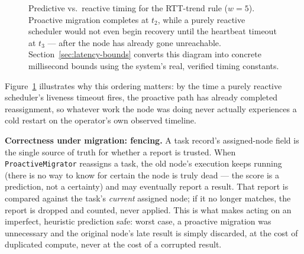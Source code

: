 \documentclass[conference]{IEEEtran}
\begin{document}
\begin{figure}[t]
\centering
{}
\caption{Predictive vs.\ reactive timing for the RTT-trend rule ($w=5$). Proactive migration completes
at $t_2$, while a purely reactive scheduler would not even begin recovery until the heartbeat timeout
at $t_3$ — after the node has already gone unreachable. Section~\ref{sec:latency-bounds} converts this
diagram into concrete millisecond bounds using the system's real, verified timing constants.}
\label{fig:migration-timeline}
\end{figure}

Figure~\ref{fig:migration-timeline} illustrates why this ordering matters: by the time a purely
reactive scheduler's liveness timeout fires, the proactive path has already completed reassignment,
so whatever work the node was doing never actually experiences a cold restart on the operator's own
observed timeline.

\textbf{Correctness under migration: fencing.} A task record's assigned-node field is the single
source of truth for whether a report is trusted. When \texttt{ProactiveMigrator} reassigns a task, the
old node's execution keeps running (there is no way to know for certain the node is truly dead — the
score is a prediction, not a certainty) and may eventually report a result. That report is compared
against the task's \emph{current} assigned node; if it no longer matches, the report is dropped and
counted, never applied. This is what makes acting on an imperfect, heuristic prediction safe: worst
case, a proactive migration was unnecessary and the original node's late result is simply discarded,
at the cost of duplicated compute, never at the cost of a corrupted result.
\end{document}
